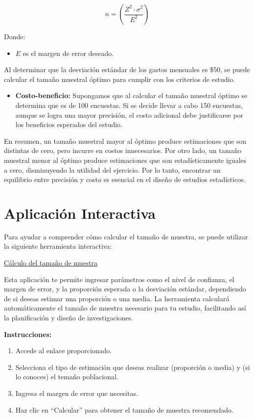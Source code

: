 \documentclass[
  letterpaper,
  DIV=11,
  numbers=noendperiod]{scrreprt}
\providecommand{\tightlist}{%
  \setlength{\itemsep}{0pt}\setlength{\parskip}{0pt}}\usepackage{longtable,booktabs,array}
\begin{document}
\[n = \left(\frac{Z^2 \cdot \sigma^2}{E^2}\right)\]

Donde:

\begin{itemize}
\tightlist
\item
  \(E\) es el margen de error deseado.
\end{itemize}

Al determinar que la desviación estándar de los gastos mensuales es
\$50, se puede calcular el tamaño muestral óptimo para cumplir con los
criterios de estudio.

\begin{itemize}
\tightlist
\item
  \textbf{Costo-beneficio:} Supongamos que al calcular el tamaño
  muestral óptimo se determina que es de 100 encuestas. Si se decide
  llevar a cabo 150 encuestas, aunque se logra una mayor precisión, el
  costo adicional debe justificarse por los beneficios esperados del
  estudio.
\end{itemize}

En resumen, un tamaño muestral mayor al óptimo produce estimaciones que
son distintas de cero, pero incurre en costos innecesarios. Por otro
lado, un tamaño muestral menor al óptimo produce estimaciones que son
estadísticamente iguales a cero, disminuyendo la utilidad del ejercicio.
Por lo tanto, encontrar un equilibrio entre precisión y costo es
esencial en el diseño de estudios estadísticos.

\section{Aplicación Interactiva}\label{aplicaciuxf3n-interactiva-2}

Para ayudar a comprender cómo calcular el tamaño de muestra, se puede
utilizar la siguiente herramienta interactiva:

\href{http://gauss.medellin.unal.edu.co:3838/fhernanb/samplesize/}{Cálculo
del tamaño de muestra}

Esta aplicación te permite ingresar parámetros como el nivel de
confianza, el margen de error, y la proporción esperada o la desviación
estándar, dependiendo de si deseas estimar una proporción o una media.
La herramienta calculará automáticamente el tamaño de muestra necesario
para tu estudio, facilitando así la planificación y diseño de
investigaciones.

\textbf{Instrucciones:}

\begin{enumerate}
\def\labelenumi{\arabic{enumi}.}
\tightlist
\item
  Accede al enlace proporcionado.
\item
  Selecciona el tipo de estimación que deseas realizar (proporción o
  media) y (si lo conoces) el temaño poblacional.
\item
  Ingresa el margen de error que necesitas.
\item
  Haz clic en ``Calcular'' para obtener el tamaño de muestra
  recomendado.
\end{enumerate}
\end{document}
